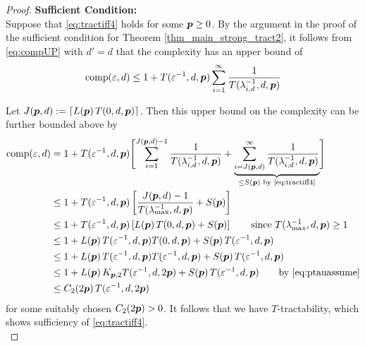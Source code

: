 \documentclass[11pt,a4paper]{article}
\begin{document}
\begin{proof}
    \textbf{Sufficient Condition:}\\
Suppose that \eqref{eq:tractiff4} holds for some $\boldsymbol{p} \ge 0$. By the argument in the proof of the sufficient condition for Theorem \ref{thm_main_strong_tract2}, it follows from \eqref{eq:compUP} with $d'=d$ that the complexity has an upper bound of
\begin{equation*}
	 \operatorname{comp}(\varepsilon,d) \le 1 + T(\varepsilon^{-1},d,\boldsymbol{p}) \sum_{i=1}^\infty \frac{1}{T(\lambda_{i, d}^{-1},d,\boldsymbol{p})}
\end{equation*}

Let $J(\boldsymbol{p},d): = \lceil L(\boldsymbol{p})\, T(0,d,\boldsymbol{p})\rceil$.  Then this upper bound on the complexity can be further bounded above by
\begin{align*}
       \operatorname{comp}(\varepsilon,d)
       & = 1 + T(\varepsilon^{-1},d,\boldsymbol{p}) \Biggl [ \sum_{i=1}^{J(\boldsymbol{p},d) -1} \frac{1}{T(\lambda_{i, d}^{-1},d,\boldsymbol{p})}
       + \underbrace{\sum_{i=J(\boldsymbol{p},d)}^\infty \frac{1}{T(\lambda_{i, d}^{-1},d,\boldsymbol{p})}}_{\le S(\boldsymbol{p}) \text{ by \eqref{eq:tractiff4}}} \Biggr ] \\
       & \le 1+ T(\varepsilon^{-1},d,\boldsymbol{p})\left[ \frac{J(\boldsymbol{p},d)-1}{T(\lambda_{\max}^{-1},d,\boldsymbol{p})} + S(\boldsymbol{p})\right]
        \\
       & \le 1+ T(\varepsilon^{-1},d,\boldsymbol{p})\left[L(\boldsymbol{p})\, T(0,d,\boldsymbol{p}) + S(\boldsymbol{p})\right] \qquad \text{since } T(\lambda_{\max}^{-1},d,\boldsymbol{p}) \ge 1\\
       & \le 1+L(\boldsymbol{p})\,T(\varepsilon^{-1},d,\boldsymbol{p}) T(0,d,\boldsymbol{p}) + S(\boldsymbol{p})\, T(\varepsilon^{-1},d,\boldsymbol{p})\\
       & \le 1+L(\boldsymbol{p})\,T(\varepsilon^{-1},d,\boldsymbol{p}) T(\varepsilon^{-1},d,\boldsymbol{p}) + S(\boldsymbol{p})\, T(\varepsilon^{-1},d,\boldsymbol{p})\\
       & \le 1+L(\boldsymbol{p})\,K_{\boldsymbol{p},2} T(\varepsilon^{-1},d,2\boldsymbol{p})  + S(\boldsymbol{p})\, T(\varepsilon^{-1},d,\boldsymbol{p})  \qquad \text{by \eqref{eq:ptauassume}}\\
       & \le C_{2}(2\boldsymbol{p}) \,T(\varepsilon^{-1},d,2\boldsymbol{p})
\end{align*}
for some suitably chosen $C_{2}(2\boldsymbol{p})>0$. It follows that we have $T$-tractability, which shows sufficiency of \eqref{eq:tractiff4}. \\




\end{proof}
\end{document}

